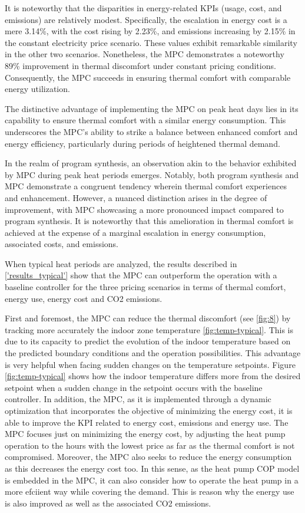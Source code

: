 It is noteworthy that the disparities in energy-related KPIs (usage, cost, and emissions) are relatively modest. Specifically, the escalation in energy cost is a mere 3.14\%, with the cost rising by 2.23\%, and emissions increasing by 2.15\% in the constant electricity price scenario. These values exhibit remarkable similarity in the other two scenarios. Nonetheless, the MPC demonstrates a noteworthy 89\% improvement in thermal discomfort under constant pricing conditions. Consequently, the MPC succeeds in ensuring thermal comfort with comparable energy utilization.

The distinctive advantage of implementing the MPC on peak heat days lies in its capability to ensure thermal comfort with a similar energy consumption. This underscores the MPC's ability to strike a balance between enhanced comfort and energy efficiency, particularly during periods of heightened thermal demand.

In the realm of program synthesis, an observation akin to the behavior exhibited by MPC during peak heat periods emerges. Notably, both program synthesis and MPC demonstrate a congruent tendency wherein thermal comfort experiences and enhancement. However, a nuanced distinction arises in the degree of improvement, with MPC showcasing a more pronounced impact compared to program synthesis. It is noteworthy that this amelioration in thermal comfort is achieved at the expense of a marginal escalation in energy consumption, associated costs, and emissions.

When typical heat periods are analyzed, the results described in \ref{'results_typical'} show that the MPC can outperform the operation with a baseline controller for the three pricing scenarios in terms of thermal comfort, energy use, energy cost and CO2 emissions. 

First and foremost, the MPC can reduce the thermal discomfort (see \ref{fig:8}) by tracking more accurately the indoor zone temperature \ref{fig:temp-typical}. This is due to its capacity to predict the evolution of the indoor temperature based on the predicted boundary conditions and the operation possibilities. This advantage is very helpful when facing sudden changes on the temperature setpoints. Figure \ref{fig:temp-typical} shows how the indoor temperature differs more from the desired setpoint when a sudden change in the setpoint occurs with the baseline controller. In addition, the MPC, as it is implemented through a dynamic optimization that incorporates the objective of minimizing the energy cost, it is able to improve the KPI related to energy cost, emissions and energy use. The MPC focuses just on minimizing the energy cost, by adjusting the heat pump operation to the hours with the lowest price as far as the thermal comfort is not compromised. Moreover, the MPC also seeks to reduce the energy consumption as this decreases the energy cost too. In this sense, as the heat pump COP model is embedded in the MPC, it can also consider how to operate the heat pump in a more efciient way while covering the demand. This is reason why the energy use is also improved as well as the associated CO2 emissions.

